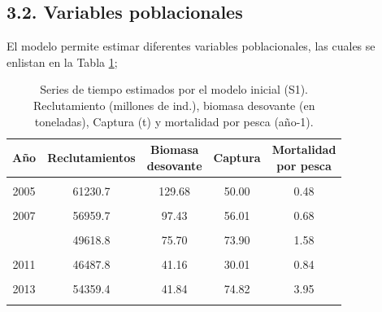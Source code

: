 \documentclass[
]{article}
\begin{document}
\pagebreak

\hypertarget{variables-poblacionales}{%
\subsection{3.2. Variables poblacionales}\label{variables-poblacionales}}

El modelo permite estimar diferentes variables poblacionales, las cuales se enlistan en la Tabla \ref{Tab4};

\begin{table}[ht!]

\caption{\label{tab:unnamed-chunk-11}\label{Tab4}Series de tiempo estimados por el modelo inicial (S1). Reclutamiento (millones de ind.),  biomasa desovante (en toneladas), Captura (t) y mortalidad por pesca (año-1).}
\centering
\fontsize{9}{11}\selectfont
\begin{tabular}[t]{ccccc}
\toprule
Año & Reclutamientos & \makecell[c]{Biomasa\\desovante} & Captura & \makecell[c]{Mortalidad\\por pesca}\\
\midrule
\cellcolor{gray!6}{2004} & \cellcolor{gray!6}{62296.6} & \cellcolor{gray!6}{131.49} & \cellcolor{gray!6}{23.00} & \cellcolor{gray!6}{0.19}\\
2005 & 61230.7 & 129.68 & 50.00 & 0.48\\
\cellcolor{gray!6}{2006} & \cellcolor{gray!6}{59486.4} & \cellcolor{gray!6}{116.10} & \cellcolor{gray!6}{38.00} & \cellcolor{gray!6}{0.41}\\
2007 & 56959.7 & 97.43 & 56.01 & 0.68\\
\cellcolor{gray!6}{2008} & \cellcolor{gray!6}{53952.3} & \cellcolor{gray!6}{91.39} & \cellcolor{gray!6}{70.11} & \cellcolor{gray!6}{1.09}\\
\addlinespace
2009 & 49618.8 & 75.70 & 73.90 & 1.58\\
\cellcolor{gray!6}{2010} & \cellcolor{gray!6}{46620.0} & \cellcolor{gray!6}{57.28} & \cellcolor{gray!6}{80.40} & \cellcolor{gray!6}{2.65}\\
2011 & 46487.8 & 41.16 & 30.01 & 0.84\\
\cellcolor{gray!6}{2012} & \cellcolor{gray!6}{47197.6} & \cellcolor{gray!6}{33.12} & \cellcolor{gray!6}{85.27} & \cellcolor{gray!6}{2.95}\\
2013 & 54359.4 & 41.84 & 74.82 & 3.95\\
\addlinespace
\cellcolor{gray!6}{2014} & \cellcolor{gray!6}{31108.3} & \cellcolor{gray!6}{26.72} & \cellcolor{gray!6}{80.63} & \cellcolor{gray!6}{4.00}\\

\end{tabular}
\end{table}
\end{document}
